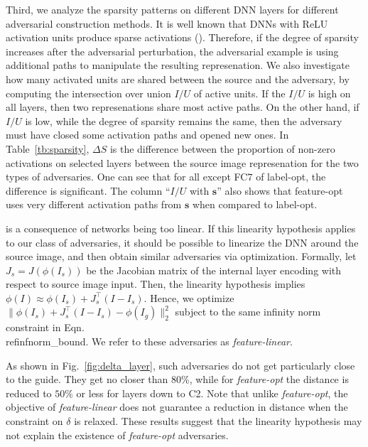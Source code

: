\documentclass{article} %
\newcommand{\source}{{\boldsymbol{\mathbf{s}}}}\newcommand{\guide}{\boldsymbol{\mathbf{g}}}\newcommand{\adv}{\boldsymbol{\mathbf{\alpha}}}\newcommand{\neigh}[2]{\ensuremath{n_{#1} ({#2})}}\newcommand{\Neighs}[2]{\ensuremath{\mathcal{N}}_{{#1}} ({#2})}\newcommand{\NNavg}[2]{\ensuremath{a_{#1} ({#2})}}\newcommand{\NNz}[2]{\ensuremath{z_{#1} ({#2})}}\newcommand{\class}[1]{C ({#1})}\newcommand{\dist}[2]{\ensuremath{D ({#1}, {#2})}}\newcommand{\rank}[2]{\ensuremath{r_{#1} ({#2})}}\newcommand{\rankdiff}[1]{\ensuremath{\Delta{r_{#1}}}}\newcommand{\dlike}[2]{\ensuremath{\Delta L({#1}, {#2})}}%
\newcommand{\T}{\ensuremath{\top}}
\begin{document}
Third, we analyze the sparsity  patterns on different DNN layers for 
different adversarial construction methods. It is well known that DNNs 
with ReLU activation units produce sparse activations 
(\cite{AISTATS2011_GlorotBB11}).  Therefore, if the degree of sparsity 
increases after the adversarial perturbation, the adversarial example 
is using additional paths to manipulate the resulting represenation. 
We also investigate how many activated units are shared between the source 
and the adversary, by computing the intersection over union {\em $I/U$} of 
active units. If the $I/U$ is high on all layers, then two represenations 
share most active paths. On the other hand, if $I/U$ is low, 
while the degree of sparsity remains the same, then the adversary must have 
closed some activation paths and opened new ones. In Table~\ref{tb:sparsity}, 
$\Delta S$ is the difference between the proportion of non-zero activations on 
selected layers between the source image represenation for the two types 
of adversaries. One can see that for all except FC$7$ of label-opt, the 
difference is significant. The column ``$I/U$ with $\source$'' also shows that 
feature-opt uses very different activation paths from $\source$ when compared 
to label-opt. 

is a consequence of networks being too linear.  If this linearity hypothesis 
applies to our class of adversaries, it should be possible to linearize the 
DNN around the source image, and then obtain similar adversaries via 
optimization. Formally, let $J_s = J(\phi(I_s))$ be the Jacobian matrix 
of the internal layer encoding with respect to source image input.  
Then, the 
linearity hypothesis implies $\phi(I) \approx \phi(I_s) + J_s^{\T}(I-I_s)$.
Hence, we optimize $\| \phi(I_s) + J_s^{\T}(I-I_s) - \phi(I_g)\|^2_2$ 
subject to the same infinity norm constraint in Eqn.\\ref{infnorm_bound}.
We refer to these adversaries as {\em feature-linear}.  

As shown in Fig.~\ref{fig:delta_layer}, such adversaries do not get 
particularly close to the guide.  They get no closer than 80\%, while
for {\em feature-opt} the distance is reduced to $50\%$ or less 
for layers down to C2.  Note that unlike {\em feature-opt}, the objective 
of {\em feature-linear} does not guarantee a reduction in distance 
when the constraint on $\delta$ is relaxed.  These results suggest that 
the linearity hypothesis may not explain the existence of {\em feature-opt} 
adversaries.  
\end{document}

